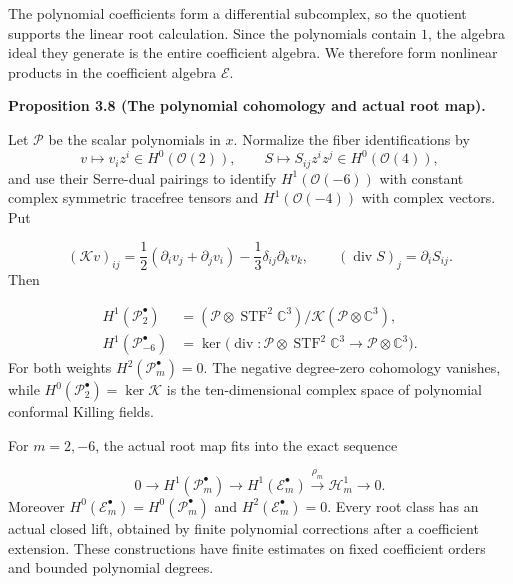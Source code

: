\documentclass[
  english,
  11pt,
  reqno]{amsart}
\makeatletter
\newcommand{\pandocstatementheading}[1]{%
  \par\addpenalty{\@beginparpenalty}%
  \addvspace{.5\baselineskip plus .2\baselineskip minus .2\baselineskip}%
  {\normalfont\bfseries #1\par}%
  \nobreak\@afterindenttrue\@afterheading
}
\makeatother
\begin{document}
The polynomial coefficients form a differential subcomplex, so the
quotient supports the linear root calculation. Since the polynomials
contain \(1\), the algebra ideal they generate is the entire coefficient
algebra. We therefore form nonlinear products in the coefficient algebra
\(\mathscr E\).

\pandocstatementheading{\leavevmode{}\label{prop:online-polynomial-cr-cohomology}Proposition 3.8 (The polynomial cohomology and actual root map).}

Let \(\mathcal P\) be the scalar polynomials in \(x\). Normalize the
fiber identifications by \[
v\longmapsto v_i z^i\in H^0(\mathcal O(2)),
\qquad
S\longmapsto S_{ij}z^iz^j\in H^0(\mathcal O(4)),
\] and use their Serre-dual pairings to identify \(H^1(\mathcal O(-6))\)
with constant complex symmetric tracefree tensors and
\(H^1(\mathcal O(-4))\) with complex vectors. Put

\label{eq:online-polynomial-killing-divergence} \[
(\mathcal Kv)_{ij}
=\frac12(\partial_i v_j+\partial_jv_i)
-\frac13\delta_{ij}\partial_kv_k,
\qquad
(\operatorname{div}S)_j=\partial_iS_{ij}.
\] Then

\label{eq:online-polynomial-first-cohomology} \[
\begin{aligned}
H^1(\mathscr P_2^\bullet)
&=(\mathcal P\otimes\operatorname{STF}^2\mathbb C^3)
  /\mathcal K(\mathcal P\otimes\mathbb C^3),\\
H^1(\mathscr P_{-6}^\bullet)
&=\ker\bigl(\operatorname{div}:
\mathcal P\otimes\operatorname{STF}^2\mathbb C^3
\longrightarrow\mathcal P\otimes\mathbb C^3\bigr).
\end{aligned}
\] For both weights \(H^2(\mathscr P_m^\bullet)=0\). The negative
degree-zero cohomology vanishes, while
\(H^0(\mathscr P_2^\bullet)=\ker\mathcal K\) is the ten-dimensional
complex space of polynomial conformal Killing fields.

For \(m=2,-6\), the actual root map fits into the exact sequence

\label{eq:online-actual-cohomology-root-extension} \[
0\longrightarrow H^1(\mathscr P_m^\bullet)
\longrightarrow H^1(\mathscr E_m^\bullet)
\xrightarrow{\rho_m}\mathscr H_m^1
\longrightarrow0.
\] Moreover \(H^0(\mathscr E_m^\bullet)=H^0(\mathscr P_m^\bullet)\) and
\(H^2(\mathscr E_m^\bullet)=0\). Every root class has an actual closed
lift, obtained by finite polynomial corrections after a coefficient
extension. These constructions have finite estimates on fixed
coefficient orders and bounded polynomial degrees.
\end{document}
